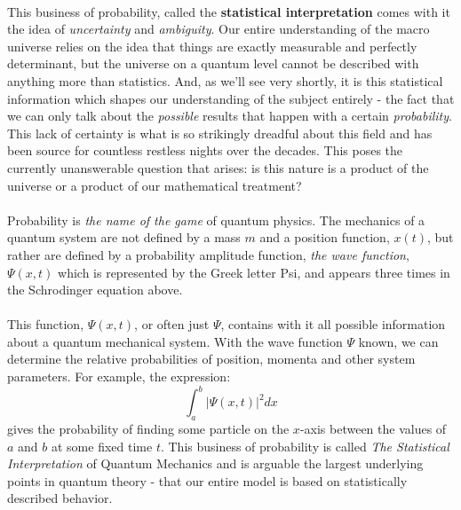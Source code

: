 \documentclass[12pt,letterpaper]{book}
\begin{document}
\paragraph*{}This business of probability, called the \textbf{statistical interpretation} comes with it the idea of \textit{uncertainty} and \textit{ambiguity}. Our entire understanding of the macro universe relies on the idea that things are exactly measurable and perfectly determinant, but the universe on a quantum level cannot be described with anything more than statistics. And, as we'll see very shortly, it is this statistical information which shapes our understanding of the subject entirely - the fact that we can only talk about the \textit{possible} results that happen with a certain \textit{probability}. This lack of certainty is what is so strikingly dreadful about this field and has been source for countless restless nights over the decades. This poses the currently unanswerable question that arises: is this nature is a product of the universe or a product of our mathematical treatment? 

\paragraph*{}Probability is \textit{the name of the game} of quantum physics. The mechanics of a quantum system are not defined by a mass $m$ and a position function, $x(t)$, but rather are defined by a probability amplitude function, \textit{the wave function}, $\Psi(x,t)$ which is represented by the Greek letter Psi, and appears three times in the Schrodinger equation above.

\paragraph*{}This function, $\Psi(x,t)$, or often just $\Psi$, contains with it all possible information about a quantum mechanical system. With the wave function $\Psi$ known, we can determine the relative probabilities of position, momenta and other system parameters. For example, the expression:
\begin{equation}
\label{prob_ab}
\int_a^b \big | \Psi(x,t) \big|^2 dx
\end{equation}
gives the probability of finding some particle on the $x$-axis between the values of $a$ and $b$ at some fixed time $t$. This business of probability is called \textit{The Statistical Interpretation} of Quantum Mechanics and is arguable the largest underlying points in quantum theory - that our entire model is based on statistically described behavior.
\end{document}
